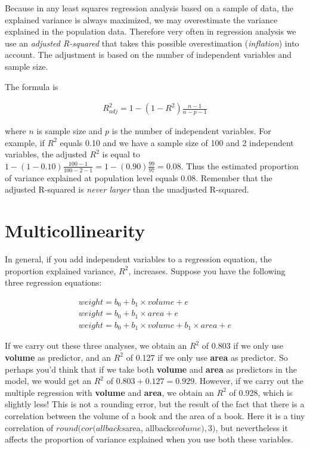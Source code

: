 \documentclass[]{book}\usepackage[]{graphicx}\usepackage[]{color}
\begin{document}
Because in any least squares regression analysis based on a sample of data, the explained variance is always maximized, we may overestimate the variance explained in the population data. Therefore very often in regression analysis we use an \textit{adjusted R-squared} that takes this possible overestimation (\textit{inflation}) into account. The adjustment is based on the number of independent variables and sample size.

The formula is


\begin{eqnarray}
R^2_{adj}= 1 - (1-R^2)\frac{n-1}{n-p-1} \nonumber
\end{eqnarray}

where $n$ is sample size and $p$ is the number of independent variables. For example, if $R^2$ equals 0.10 and we have a sample size of 100 and 2 independent variables, the adjusted $R^2$ is equal to $1 - (1-0.10)\frac{100-1}{100-2-1}= 1 - (0.90)\frac{99}{97}=0.08$. Thus the estimated proportion of variance explained at population level equals 0.08. Remember that the adjusted R-squared is \textit{never larger} than the unadjusted R-squared.




\section{Multicollinearity}

In general, if you add independent variables to a regression equation, the proportion explained variance, $R^2$, increases. Suppose you have the following three regression equations:

\begin{eqnarray}
weight = b_0 + b_1 \times  volume + e \\
weight = b_0 + b_1 \times  area + e \\
weight = b_0 + b_1 \times  volume + b_1 \times  area + e
\end{eqnarray}

If we carry out these three analyses, we obtain an $R^2$ of 0.803 if we only use \textbf{volume} as predictor, and an $R^2$ of 0.127 if we only use \textbf{area} as predictor. So perhaps you'd think that if we take both \textbf{volume} and \textbf{area} as predictors in the model, we would get an $R^2$ of $0.803+0.127= 0.929$. However, if we carry out the multiple regression with \textbf{volume} and \textbf{area}, we obtain an $R^2$ of 0.928, which is slightly less! This is not a rounding error, but the result of the fact that there is a correlation between the volume of a book and the area of a book. Here it is a tiny correlation of $round(cor(allbacks$area, allbacks$volume),3)$, but nevertheless it affects the proportion of variance explained when you use both these variables.
\end{document}
